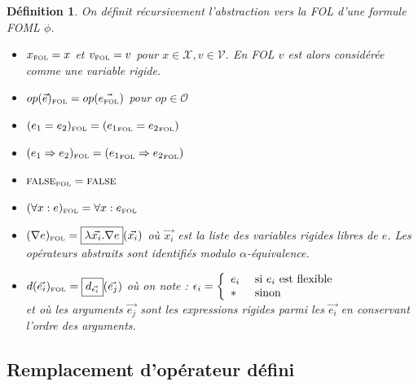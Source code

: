 \documentclass[12pt]{article}
\newcommand{\FOL}{\ensuremath{\textup{\tiny{}FOL}}}
\newcommand{\raph}[1]{\textcolor{red}{#1}}
\newcommand{\bpar}[1]{\marginpar{\color{myblue}\footnotesize\raggedright#1}}
\newcommand{\FALSE}{\textsc{false}}
\newtheorem{defin}{Définition}
\begin{document}
\begin{defin}
  On définit récursivement l'abstraction vers la FOL d'une formule FOML $\phi$.
  \begin{itemize}
  \item
    $x_\FOL = x$ et $v_\FOL = v$ pour $x \in \mathcal{X}, v \in \mathcal{V}$. En FOL $v$ est alors considérée comme une variable rigide.
  \item
    $op(\vec{e})_\FOL = op(\vec{e_\FOL})$ pour $op \in \mathcal{O}$
  \item
    $(e_1 = e_2)_\FOL = ({e_1}_\FOL = {e_2}_\FOL)$
  \item
    $(e_1 \Rightarrow e_2)_\FOL = ({e_1}_\FOL \Rightarrow {e_2}_\FOL)$
  \item
    $\FALSE_\FOL = \FALSE$
  \item
    $(\forall x : e)_\FOL = \forall x : e_\FOL$
  \item
    \( (\nabla e)_\FOL = \fbox{$\lambda \vec{x_i} . \nabla e$}(\vec{x_i}) \) où $\vec{x_i}$ est %
    la liste des variables rigides libres de $e$.
    Les opérateurs abstraits  %
    sont identifiés modulo $\alpha$-équivalence.
  \item
    \( d(\vec{e_i})_\FOL = \fbox{$d_{\vec{\epsilon_i}}$}(\vec{e_j}) \) où on note :
    \( \epsilon_i = \left \{
      \begin{array}{l l}
        e_i & \textup{ si $e_i$ est flexible } \\
        * & \textup{ sinon }
      \end{array} \right . \)\\
    et où les arguments $\vec{e_j}$ sont les expressions rigides parmi les $\vec{e_i}$ en conservant l'ordre des arguments.
  \end{itemize}
\end{defin}


\subsection{Remplacement d'opérateur défini}
\end{document}
